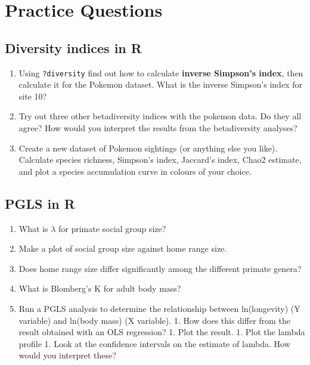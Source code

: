 \documentclass[]{book}
\providecommand{\tightlist}{%
  \setlength{\itemsep}{0pt}\setlength{\parskip}{0pt}}
\begin{document}
\chapter{Practice Questions}\label{practice-questions}

\section{Diversity indices in R}\label{diversity-indices-in-r-1}

\begin{enumerate}
\def\labelenumi{\arabic{enumi}.}
\tightlist
\item
  Using \texttt{?diversity} find out how to calculate \textbf{inverse
  Simpson's index}, then calculate it for the Pokemon dataset. What is
  the inverse Simpson's index for site 10?
\item
  Try out three other betadiversity indices with the pokemon data. Do
  they all agree? How would you interpret the results from the
  betadiversity analyses?
\item
  Create a new dataset of Pokemon sightings (or anything else you like).
  Calculate species richness, Simpson's index, Jaccard's index, Chao2
  estimate, and plot a species accumulation curve in colours of your
  choice.
\end{enumerate}

\section{PGLS in R}\label{pgls-in-r}

\begin{enumerate}
\def\labelenumi{\arabic{enumi}.}
\tightlist
\item
  What is \(\lambda\) for primate social group size?
\item
  Make a plot of social group size against home range size.
\item
  Does home range size differ significantly among the different primate
  genera?
\item
  What is Blomberg's K for adult body mass?
\item
  Run a PGLS analysis to determine the relationship between
  ln(longevity) (Y variable) and ln(body mass) (X variable). 1. How does
  this differ from the result obtained with an OLS regression? 1. Plot
  the result. 1. Plot the lambda profile 1. Look at the confidence
  intervals on the estimate of lambda. How would you interpret these?
\end{enumerate}
\end{document}
